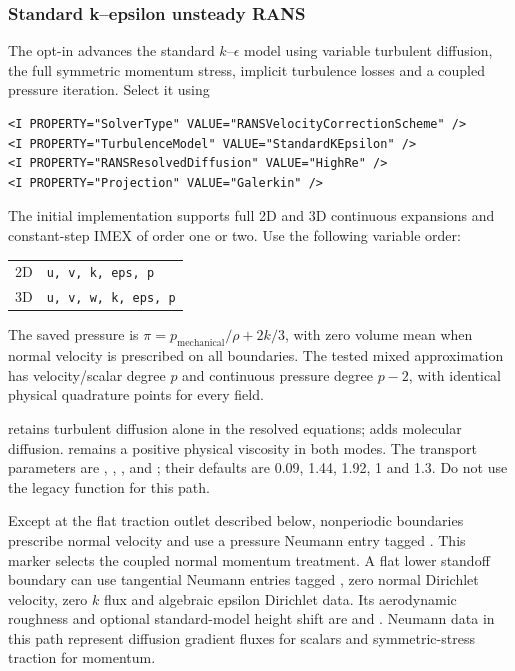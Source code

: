 \subsubsection{Standard k--epsilon unsteady RANS}
\label{RANSVCSScheme}

The opt-in  advances the standard
$k$--$\epsilon$ model using variable turbulent diffusion, the full symmetric
momentum stress, implicit turbulence losses and a coupled pressure iteration.
Select it using
\begin{lstlisting}[style=XmlStyle]
<I PROPERTY="SolverType" VALUE="RANSVelocityCorrectionScheme" />
<I PROPERTY="TurbulenceModel" VALUE="StandardKEpsilon" />
<I PROPERTY="RANSResolvedDiffusion" VALUE="HighRe" />
<I PROPERTY="Projection" VALUE="Galerkin" />
\end{lstlisting}
The initial implementation supports full 2D and 3D continuous expansions and
constant-step IMEX of order one or two. Use the following variable order:
\begin{center}
\begin{tabular}{ll}
2D & \texttt{u, v, k, eps, p} \\
3D & \texttt{u, v, w, k, eps, p}
\end{tabular}
\end{center}
The saved pressure
is $\pi=p_{\mathrm{mechanical}}/\rho+2k/3$, with zero volume mean when normal
velocity is prescribed on all boundaries. The tested
mixed approximation has velocity/scalar degree $p$ and continuous pressure
degree $p-2$, with identical physical quadrature points for every field.

 retains turbulent diffusion alone in the resolved equations;
 adds molecular diffusion.  remains a positive
physical viscosity in both modes. The transport parameters are
, , ,
 and ; their defaults are
0.09, 1.44, 1.92, 1 and 1.3. Do not use the legacy
 function for this path.

Except at the flat traction outlet described below, nonperiodic boundaries
prescribe normal velocity and use a pressure Neumann
entry tagged . This marker selects the coupled normal
momentum treatment. A flat lower standoff boundary can use tangential
Neumann entries tagged , zero normal Dirichlet velocity,
zero $k$ flux and algebraic epsilon Dirichlet data. Its aerodynamic roughness
and optional standard-model height shift are  and
. Neumann data in this path represent diffusion gradient
fluxes for scalars and symmetric-stress traction for momentum.

